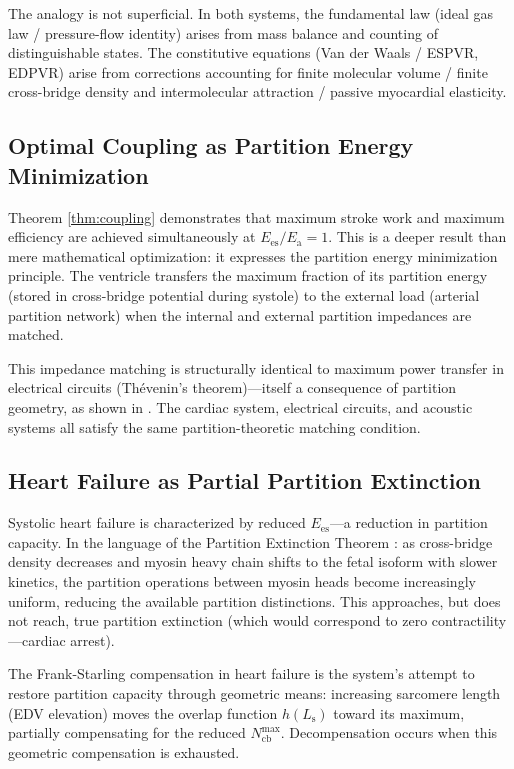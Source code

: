 \documentclass[10pt,twocolumn,a4paper]{article}
\theoremstyle{remark}
\newcommand{\Ees}{E_{\mathrm{es}}}
\newcommand{\Ea}{E_{\mathrm{a}}}
\newcommand{\Ncb}{N_{\mathrm{cb}}}
\newcommand{\Ls}{L_{\mathrm{s}}}
\begin{document}
The analogy is not superficial. In both systems, the fundamental law (ideal gas law / pressure-flow identity) arises from mass balance and counting of distinguishable states. The constitutive equations (Van der Waals / ESPVR, EDPVR) arise from corrections accounting for finite molecular volume / finite cross-bridge density and intermolecular attraction / passive myocardial elasticity.

\subsection{Optimal Coupling as Partition Energy Minimization}

Theorem \ref{thm:coupling} demonstrates that maximum stroke work and maximum efficiency are achieved simultaneously at $\Ees/\Ea = 1$. This is a deeper result than mere mathematical optimization: it expresses the partition energy minimization principle. The ventricle transfers the maximum fraction of its partition energy (stored in cross-bridge potential during systole) to the external load (arterial partition network) when the internal and external partition impedances are matched.

This impedance matching is structurally identical to maximum power transfer in electrical circuits (Thévenin's theorem)—itself a consequence of partition geometry, as shown in \cite{sachikonye2024transport}. The cardiac system, electrical circuits, and acoustic systems all satisfy the same partition-theoretic matching condition.

\subsection{Heart Failure as Partial Partition Extinction}

Systolic heart failure is characterized by reduced $\Ees$—a reduction in partition capacity. In the language of the Partition Extinction Theorem \cite{sachikonye2024gas}: as cross-bridge density decreases and myosin heavy chain shifts to the fetal isoform with slower kinetics, the partition operations between myosin heads become increasingly uniform, reducing the available partition distinctions. This approaches, but does not reach, true partition extinction (which would correspond to zero contractility—cardiac arrest).

The Frank-Starling compensation in heart failure is the system's attempt to restore partition capacity through geometric means: increasing sarcomere length (EDV elevation) moves the overlap function $h(\Ls)$ toward its maximum, partially compensating for the reduced $\Ncb^{\max}$. Decompensation occurs when this geometric compensation is exhausted.
\end{document}
